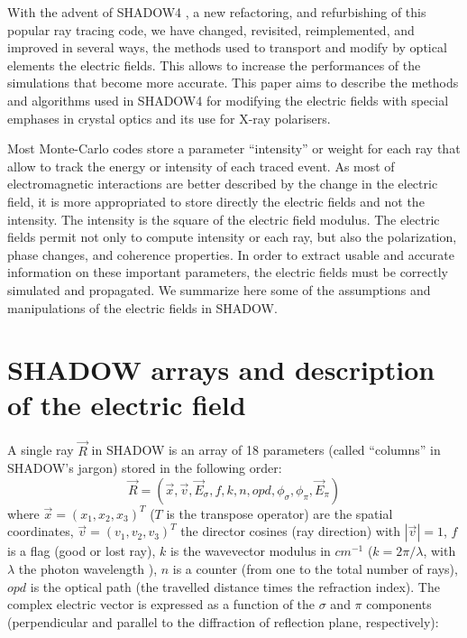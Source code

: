 \documentclass{iucr}
\begin{document}
With the advent of SHADOW4 \cite{ShadowSRN2023}, a new refactoring, and refurbishing of this popular ray tracing code, we have changed, revisited, reimplemented, and improved in several ways, the methods used to transport and modify by optical elements the electric fields. This allows to increase the performances of the simulations that become more accurate.
This paper aims to describe the methods and algorithms used in SHADOW4 for modifying the electric fields with special emphases in crystal optics and its use for X-ray polarisers.   

Most Monte-Carlo codes store a parameter ``intensity'' or weight for each ray that allow to track the energy or intensity of each traced event.
As most of electromagnetic interactions are better described by the change in the electric field, it is more appropriated to store directly the electric fields and not the intensity. 
The intensity is the square of the electric field modulus.
The electric fields permit not only to compute intensity or each ray, but also the polarization, phase changes, and coherence properties.
In order to extract usable and accurate information on these important parameters, the electric fields must be correctly simulated and propagated.
We summarize here some of the assumptions and manipulations of the electric fields in SHADOW. 

\section{SHADOW arrays and description of the electric field}
\label{sec:definitions}



A single ray $\vec{R}$ in SHADOW is an array of 18 parameters (called ``columns'' in SHADOW's jargon) stored in the following order:
\begin{equation}
   \vec{R}=( \vec{x},\vec{v},\vec{E}_\sigma,f,k,n,opd,\phi_\sigma,\phi_\pi,\vec{E}_\pi)
\end{equation}
where $\vec{x}=(x_1,x_2,x_3)^T$ ($T$ is the transpose operator) are the spatial coordinates, $\vec{v}=(v_1,v_2,v_3)^T$ the director cosines (ray direction) with $|\vec{v}|=1$, $f$ is a flag (good or lost ray), $k$ is the wavevector modulus in $cm^{-1}$ ($k=2\pi / \lambda$, with $\lambda$ the photon wavelength ), $n$ is a counter (from one to the total number of rays), $opd$ is the optical path (the travelled distance times the refraction index).
The complex electric vector is expressed as a function of the $\sigma$ and $\pi$ components (perpendicular and parallel to the diffraction of reflection plane, respectively):
\end{document}
